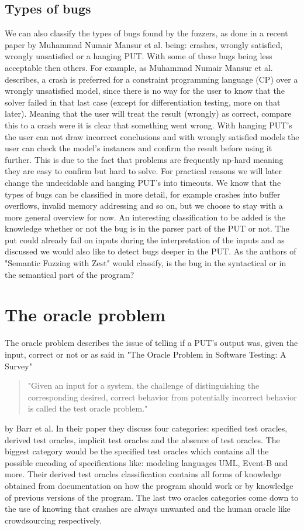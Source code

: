 \subsection{Types of bugs}
\label{cha:2:TypesOfBugs}
We can also classify the types of bugs found by the fuzzers, as done in a recent paper\cite{1mansur2020detecting} by Muhammad Numair Mansur et al. being: crashes, wrongly satisfied, wrongly unsatisfied or a hanging PUT. With some of these bugs being less acceptable then others. For example, as Muhammad Numair Mansur et al. describes, a crash is preferred for a constraint programming language (CP) over a wrongly unsatisfied model, since there is no way for the user to know that the solver failed in that last case (except for differentiation testing, more on that later). Meaning that the user will treat the result (wrongly) as correct, compare this to a crash were it is clear that something went wrong. With hanging PUT's the user can not draw incorrect conclusions and with wrongly satisfied models the user can check the model's instances and confirm the result before using it further. This is due to the fact that problems are frequently np-hard meaning they are easy to confirm but hard to solve. For practical reasons we will later change the undecidable and hanging PUT's into timeouts. We know that the types of bugs can be classified in more detail, for example crashes into buffer overflows, invalid memory addressing and so on, but we choose to stay with a more general overview for now. An interesting classification to be added is the knowledge whether or not the bug is in the parser part of the PUT or not. The put could already fail on inputs during the interpretation of the inputs and as discussed we would also like to detect bugs deeper in the PUT. As the authors of "Semantic Fuzzing with Zest"\cite{22SemanticFuzzing} would classify, is the bug in the syntactical or in the semantical part of the program?

\section{The oracle problem}
\label{cha:2:OracleProblem}
The oracle problem describes the issue of telling if a PUT's output was, given the input, correct or not or as said in "The Oracle Problem in Software Testing: A Survey"\cite{10barr2014oracleProblem} 
\begin{quote}
	"Given an input for a system, the challenge of distinguishing the corresponding desired, correct behavior from potentially incorrect behavior is called the test oracle problem."
\end{quote} by Barr et al.
In their paper they discuss four categories: specified test oracles, derived test oracles, implicit test oracles and the absence of test oracles. The biggest category would be the specified test oracles which contains all the possible encoding of specifications like: modeling languages UML, Event-B and more. Their derived test oracles classification contains all forms of knowledge obtained from documentation on how the program should work or by knowledge of previous versions of the program. The last two oracles categories come down to the use of knowing that crashes are always unwanted and the human oracle like crowdsourcing respectively.


